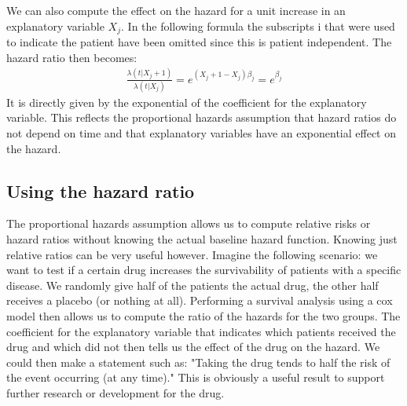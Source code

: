 We can also compute the effect on the hazard for a unit increase in an explanatory variable $X_{j}$. In the following formula the subscripts i that were used to indicate the patient have been omitted since this is patient independent. The hazard ratio then becomes:
\begin{equation}
\begin{split}
\frac{\lambda(t|X_{j}+1)}{\lambda(t|X_{j})} = e^{(X_{j}+1-X_{j})\beta_{j}} = e^{\beta_{j}}
\end{split}
\end{equation}
It is directly given by the exponential of the coefficient for the explanatory variable. This reflects the proportional hazards assumption that hazard ratios do not depend on time and that explanatory variables have an exponential effect on the hazard.
\subsection{Using the hazard ratio}
The proportional hazards assumption allows us to compute relative risks or hazard ratios without knowing the actual baseline hazard function. Knowing just relative ratios can be very useful however. Imagine the following scenario: we want to test if a certain drug increases the survivability of patients with a specific disease. We randomly give half of the patients the actual drug, the other half receives a placebo (or nothing at all). Performing a survival analysis using a cox model then allows us to compute the ratio of the hazards for the two groups. The coefficient for the explanatory variable that indicates which patients received the drug and which did not then tells us the effect of the drug on the hazard. We could then make a statement such as: "Taking the drug tends to half the risk of the event occurring (at any time)." This is obviously a useful result to support further research or development for the drug.

